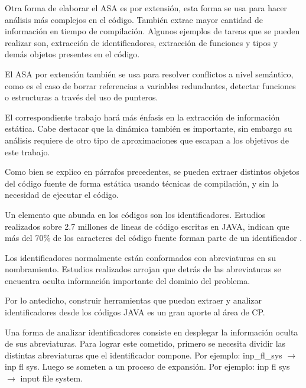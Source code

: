\documentclass[a4paper,12pt]{report}
\begin{document}
\hspace{0.5cm}Otra forma de elaborar el ASA es por extensión\cite{AHUL06}, esta forma se usa para hacer análisis más complejos en el código. También extrae mayor cantidad de información en tiempo de compilación. Algunos ejemplos de tareas que se pueden realizar son, extracción de identificadores, extracción de funciones y tipos y demás objetos presentes en el código. 

\hspace{0.5cm}El ASA por extensión también se usa para resolver conflictos a nivel semántico, como es el caso de borrar referencias a variables redundantes, detectar funciones o estructuras a través del uso de punteros.

\hspace{0.5cm}El correspondiente trabajo hará más énfasis en la extracción de información estática. Cabe destacar que la dinámica también es importante, sin embargo su análisis requiere de otro tipo de aproximaciones que escapan a los objetivos de este trabajo. 

\hspace{0.5cm}Como bien se explico en párrafos precedentes, se pueden extraer distintos objetos del código fuente de forma estática usando técnicas de compilación, y sin la necesidad de ejecutar el código. 


\hspace{0.5cm}Un elemento que abunda en los códigos son los identificadores. Estudios realizados sobre 2.7 millones de lineas de código escritas en JAVA, indican que más del 70\% de los caracteres del código fuente forman parte de un identificador \cite{DFPM05,DMDJ13}.

\hspace{0.5cm}Los identificadores normalmente están conformados con abreviaturas en su nombramiento. Estudios realizados \cite{BCPT99,LFBEX07,EZH08,EHPV09} arrojan que detrás de las abreviaturas se encuentra oculta información importante del dominio del problema.

\hspace{0.5cm}Por lo antedicho, construir herramientas que puedan extraer y analizar identificadores desde los códigos JAVA es un gran aporte al área de CP. 

\hspace{0.5cm}Una forma de analizar identificadores consiste en desplegar la información oculta de sus abreviaturas. Para lograr este cometido, primero se necesita dividir las distintas abreviaturas que el identificador compone. Por ejemplo: \textsf{inp\_fl\_sys} $\rightarrow$ \textsf{inp fl sys}. Luego se someten a un proceso de expansión. Por ejemplo: \textsf{inp fl sys} $\rightarrow$ \textsf{input file system}.
\end{document}
